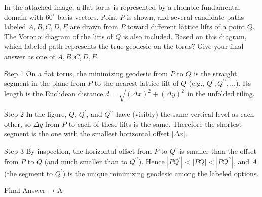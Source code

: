 In the attached image, a flat torus is represented by a rhombic fundamental domain with $60^\circ$ basis vectors. Point $P$ is shown, and several candidate paths labeled $A,B,C,D,E$ are drawn from $P$ toward different lattice lifts of a point $Q$. The Voronoi diagram of the lifts of $Q$ is also included. Based on this diagram, which labeled path represents the true geodesic on the torus? Give your final answer as one of $A,B,C,D,E$.

Step 1
On a flat torus, the minimizing geodesic from $P$ to $Q$ is the straight segment in the plane from $P$ to the nearest lattice lift of $Q$ (e.g., $Q^\prime, Q^{\prime\prime},\dots$). Its length is the Euclidean distance $d=\sqrt{(\Delta x)^2+(\Delta y)^2}$ in the unfolded tiling.

Step 2
In the figure, $Q$, $Q^\prime$, and $Q^{\prime\prime}$ have (visibly) the same vertical level as each other, so $\Delta y$ from $P$ to each of these lifts is the same. Therefore the shortest segment is the one with the smallest horizontal offset $|\Delta x|$.

Step 3
By inspection, the horizontal offset from $P$ to $Q^\prime$ is smaller than the offset from $P$ to $Q$ (and much smaller than to $Q^{\prime\prime}$). Hence $|PQ^\prime|<|PQ|<|PQ^{\prime\prime}|$, and $A$ (the segment to $Q^\prime$) is the unique minimizing geodesic among the labeled options.

Final Answer → A